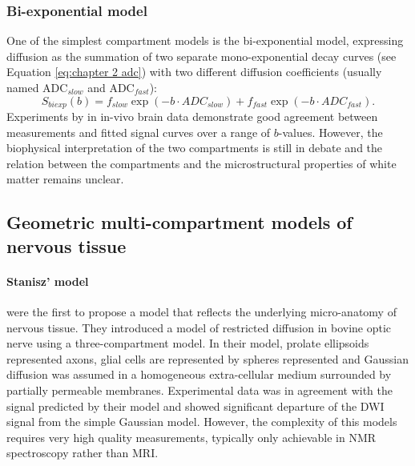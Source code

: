 \subsubsection*{Bi-exponential model}
One of the simplest compartment models is the bi-exponential model, expressing diffusion as the summation of two separate mono-exponential decay curves (see Equation \ref{eq:chapter 2 adc}) with two different diffusion coefficients (usually named \gls{ADC}$_{slow}$ and \gls{ADC}$_{fast}$):
\begin{equation}
	S_{biexp}(b) = f_{slow} \exp(-b\cdot ADC_{slow}) + f_{fast} \exp(-b\cdot ADC_{fast}).
\end{equation}
Experiments by \citet{Clark:2002} in in-vivo brain data demonstrate good agreement between measurements and fitted signal curves over a range of $b$-values. However, the biophysical interpretation of the two compartments is still in debate and the relation between the compartments and the microstructural properties of white matter remains unclear. 
\subsection*{Geometric multi-compartment models of nervous tissue}
\paragraph*{Stanisz' model}
\cite{Stanisz:1997} were the first to propose a model that reflects the underlying micro-anatomy of nervous tissue. They introduced a model of restricted diffusion in bovine optic nerve using a three-compartment model. In their model, prolate ellipsoids represented axons, glial cells are represented by spheres represented and Gaussian diffusion was assumed in a homogeneous extra-cellular medium surrounded by partially permeable membranes. Experimental data was in agreement with the signal predicted by their model and showed significant departure of the {\gls{DWI}} signal from the simple Gaussian model. However, the complexity of this models requires very high quality measurements, typically only achievable in NMR spectroscopy rather than MRI.
